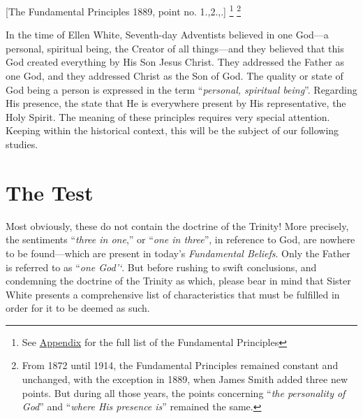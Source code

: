 
[The Fundamental Principles 1889, point no. 1.,2.,.] \footnote{See \hyperref[chap:appendix]{Appendix} for the full list of the Fundamental Principles} \footnote{From 1872 until 1914, the Fundamental Principles remained constant and unchanged, with the exception in 1889, when James Smith added three new points. But during all those years, the points concerning “\textit{the personality of God}” and “\textit{where His presence is}” remained the same. }

In the time of Ellen White, Seventh-day Adventists believed in one God—a personal, spiritual being, the Creator of all things—and they believed that this God created everything by His Son Jesus Christ. They addressed the Father as one God, and they addressed Christ as the Son of God. The quality or state of God being a person is expressed in the term “\textit{personal, spiritual being}”. Regarding His presence, the  state that He is everywhere present by His representative, the Holy Spirit. The meaning of these principles requires very special attention. Keeping within the historical context, this will be the subject of our following studies.  

\section*{The Test}

Most obviously, these  do not contain the doctrine of the Trinity! More precisely, the sentiments “\textit{three in one},” or “\textit{one in three}”, in reference to God, are nowhere to be found—which are present in today’s \textit{Fundamental Beliefs}. Only the Father is referred to as “\textit{one God’‘}. But before rushing to swift conclusions, and condemning the doctrine of the Trinity as which, please bear in mind that Sister White presents a comprehensive list of characteristics that must be fulfilled in order for it to be deemed as such.

